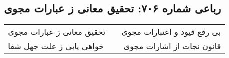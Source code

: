 \begin{center}
\section*{رباعی شماره ۷۰۶: تحقیق معانی ز عبارات مجوی}
\label{sec:sh706}
\begin{longtable}{l p{0.5cm} r}
تحقیق معانی ز عبارات مجوی
&&
بی رفع قیود و اعتبارات مجوی
\\
خواهی یابی ز علت جهل شفا
&&
قانون نجات از اشارات مجوی
\\
\end{longtable}
\end{center}
